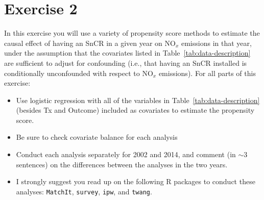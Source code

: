 
\section{Exercise 2}

\begin{quoting}
  In this exercise you will use a variety of propensity score methods
  to estimate the causal effect of having an SnCR in a given year on
  $\text{NO}_x$ emissions in that year, under the assumption that the
  covariates listed in Table~\ref{tab:data-description} are sufficient
  to adjust for confounding (i.e., that having an SnCR installed is
  conditionally unconfounded with respect to $\text{NO}_x$
  emissions). For all parts of this exercise:
  \begin{itemize}
  \item Use logistic regression with all of the variables in
    Table~\ref{tab:data-description} (besides Tx and Outcome) included
    as covariates to estimate the propensity score.
  \item Be sure to check covariate balance for each analysis
  \item Conduct each analysis separately for 2002 and 2014, and
    comment (in $\sim$3 sentences) on the differences between the analyses
    in the two years. 
  \item I strongly suggest you read up on the following \textsf{R}
    packages to conduct these analyses: \texttt{MatchIt},
    \texttt{survey}, \texttt{ipw}, and \texttt{twang}.
  \end{itemize}
\end{quoting}

